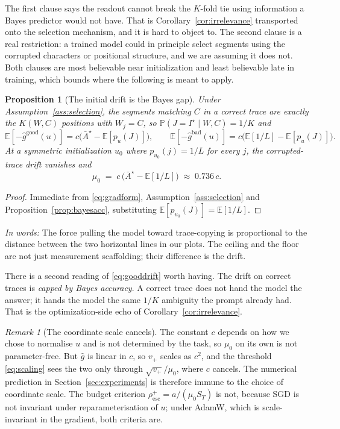 \documentclass{article}
\theoremstyle{plain}
\newtheorem{proposition}{Proposition}
\theoremstyle{definition}
\theoremstyle{remark}
\newtheorem{remark}{Remark}
\newcommand{\E}{\mathbb{E}}
\newcommand{\Prob}{\mathbb{P}}
\newcommand{\1}{\mathbf{1}}
\newcommand{\good}{\mathrm{good}}
\newcommand{\bad}{\mathrm{bad}}
\newcommand{\takeaway}[1]{%
  \par\medskip\noindent\textit{In words:} #1\par\medskip}
\begin{document}
The first clause says the readout cannot break the $K$-fold tie using information
a Bayes predictor would not have. That is Corollary~\ref{cor:irrelevance}
transported onto the selection mechanism, and it is hard to object to. The second
clause is a real restriction: a trained model could in principle select segments
using the corrupted characters or positional structure, and we are assuming it
does not. Both clauses are most believable near initialization and least
believable late in training, which bounds where the following is meant to apply.

\begin{proposition}[The initial drift is the Bayes gap]
\label{prop:mu0}
Under Assumption~\ref{ass:selection}, the segments matching $C$ in a correct
trace are exactly the $K(W,C)$ positions with $W_j=C$, so
$\Prob(J = I^\star\mid W,C) = 1/K$ and
\begin{equation}
\label{eq:gooddrift}
\E[-\hat g^{\good}(u)] = c\big(\bar A^\star - \E[p_u(J)]\big),
\qquad
\E[-\hat g^{\bad}(u)] = c\big(\E[1/L] - \E[p_u(J)]\big).
\end{equation}
At a symmetric initialization $u_0$ where $p_{u_0}(j) = 1/L$ for every $j$, the
corrupted-trace drift vanishes and
\begin{equation}
\label{eq:mu0}
\mu_0 \;=\; c\,\big(\bar A^\star - \E[1/L]\big) \;\approx\; 0.736\,c .
\end{equation}
\end{proposition}

\begin{proof}
Immediate from \eqref{eq:gradform}, Assumption~\ref{ass:selection} and
Proposition~\ref{prop:bayesacc}, substituting $\E[p_{u_0}(J)] = \E[1/L]$.
\end{proof}

\takeaway{The force pulling the model toward trace-copying is proportional to the
distance between the two horizontal lines in our plots. The ceiling and the floor
are not just measurement scaffolding; their difference is the drift.}

There is a second reading of \eqref{eq:gooddrift} worth having. The drift on
correct traces is \emph{capped by Bayes accuracy}. A correct trace does not hand
the model the answer; it hands the model the same $1/K$ ambiguity the prompt
already had. That is the optimization-side echo of
Corollary~\ref{cor:irrelevance}.

\begin{remark}[The coordinate scale cancels]
\label{rem:scale}
The constant $c$ depends on how we chose to normalise $u$ and is not determined
by the task, so $\mu_0$ on its own is not parameter-free. But $\hat g$ is linear
in $c$, so $v_+$ scales as $c^2$, and the threshold \eqref{eq:scaling} sees the
two only through $\sqrt{v_+}/\mu_0$, where $c$ cancels. The numerical prediction
in Section~\ref{sec:experiments} is therefore immune to the choice of coordinate
scale. The budget criterion $\rho^{+}_{\mathrm{esc}} = a/(\mu_0S_T)$ is not,
because SGD is not invariant under reparameterisation of $u$; under AdamW, which
is scale-invariant in the gradient, both criteria are.
\end{remark}
\end{document}
